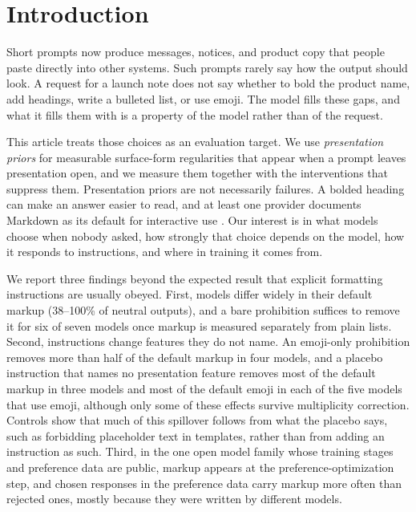 \documentclass[acmsmall,screen,review,anonymous]{acmart}
\begin{document}

\maketitle

\section{Introduction}

Short prompts now produce messages, notices, and product copy that people paste directly into other systems. Such prompts rarely say how the output should look. A request for a launch note does not say whether to bold the product name, add headings, write a bulleted list, or use emoji. The model fills these gaps, and what it fills them with is a property of the model rather than of the request.

This article treats those choices as an evaluation target. We use \emph{presentation priors} for measurable surface-form regularities that appear when a prompt leaves presentation open, and we measure them together with the interventions that suppress them. Presentation priors are not necessarily failures. A bolded heading can make an answer easier to read, and at least one provider documents Markdown as its default for interactive use \cite{openai2024modelspec}. Our interest is in what models choose when nobody asked, how strongly that choice depends on the model, how it responds to instructions, and where in training it comes from.

We report three findings beyond the expected result that explicit formatting instructions are usually obeyed. First, models differ widely in their default markup (38--100\% of neutral outputs), and a bare prohibition suffices to remove it for six of seven models once markup is measured separately from plain lists. Second, instructions change features they do not name. An emoji-only prohibition removes more than half of the default markup in four models, and a placebo instruction that names no presentation feature removes most of the default markup in three models and most of the default emoji in each of the five models that use emoji, although only some of these effects survive multiplicity correction. Controls show that much of this spillover follows from what the placebo says, such as forbidding placeholder text in templates, rather than from adding an instruction as such. Third, in the one open model family whose training stages and preference data are public, markup appears at the preference-optimization step, and chosen responses in the preference data carry markup more often than rejected ones, mostly because they were written by different models.
\end{document}
